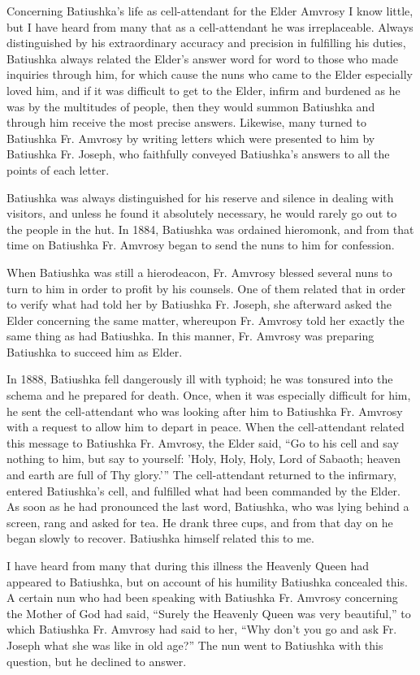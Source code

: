 Concerning Batiushka's life as cell-attendant for the Elder Amvrosy I know little, but I have heard from many that as a cell-attendant he was irreplaceable. Always distinguished by his extraordinary accuracy and precision in fulfilling his duties, Batiushka always related the Elder's answer word for word to those who made inquiries through him, for which cause the nuns who came to the Elder especially loved him, and if it was difficult to get to the Elder, infirm and burdened as he was by the multitudes of people, then they would summon Batiushka and through him receive the most precise answers. Likewise, many turned to Batiushka Fr. Amvrosy by writing letters which were presented to him by Batiushka Fr. Joseph, who faithfully conveyed Batiushka's answers to all the points of each letter.

Batiushka was always distinguished for his reserve and silence in dealing with visitors, and unless he found it absolutely necessary, he would rarely go out to the people in the hut. In 1884, Batiushka was ordained hieromonk, and from that time on Batiushka Fr. Amvrosy began to send the nuns to him for confession.

When Batiushka was still a hierodeacon, Fr. Amvrosy blessed several nuns to turn to him in order to profit by his counsels. One of them related that in order to verify what had told her by Batiushka Fr. Joseph, she afterward asked the Elder concerning the same matter, whereupon Fr. Amvrosy told her exactly the same thing as had Batiushka. In this manner, Fr. Amvrosy was preparing Batiushka to succeed him as Elder.

In 1888, Batiushka fell dangerously ill with typhoid; he was tonsured into the schema and he prepared for death. Once, when it was especially difficult for him, he sent the cell-attendant who was looking after him to Batiushka Fr. Amvrosy with a request to allow him to depart in peace. When the cell-attendant related this message to Batiushka Fr. Amvrosy, the Elder said, “Go to his cell and say nothing to him, but say to yourself: 'Holy, Holy, Holy, Lord of Sabaoth; heaven and earth are full of Thy glory.'” The cell-attendant returned to the infirmary, entered Batiushka's cell, and fulfilled what had been commanded by the Elder. As soon as he had pronounced the last word, Batiushka, who was lying behind a screen, rang and asked for tea. He drank three cups, and from that day on he began slowly to recover. Batiushka himself related this to me.

I have heard from many that during this illness the Heavenly Queen had appeared to Batiushka, but on account of his humility Batiushka concealed this. A certain nun who had been speaking with Batiushka Fr. Amvrosy concerning the Mother of God had said, “Surely the Heavenly Queen was very beautiful,” to which Batiushka Fr. Amvrosy had said to her, “Why don't you go and ask Fr. Joseph what she was like in old age?” The nun went to Batiushka with this question, but he declined to answer.

